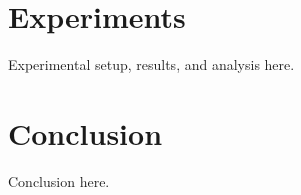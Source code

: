 \documentclass{article} %
\begin{document}
\section{Experiments}
\label{sec:experiments}
Experimental setup, results, and analysis here.

\section{Conclusion}
\label{sec:conclusion}
Conclusion here.




\end{document}
